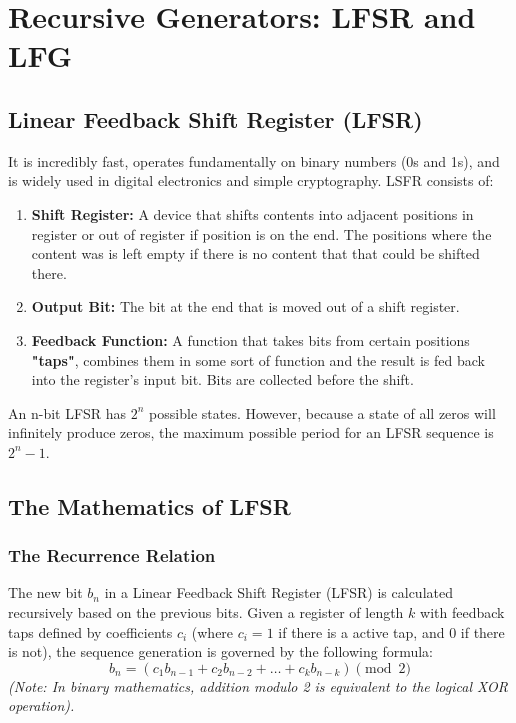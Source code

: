 \section{Recursive Generators: LFSR and LFG}

\subsection{Linear Feedback Shift Register (LFSR)} 

It is incredibly fast, operates fundamentally on binary numbers (0s and 1s), and is widely used in digital electronics and simple cryptography. LSFR consists of:

\begin{enumerate}
    \item \textbf{Shift Register:} A device that shifts contents into adjacent positions in register or out of register if position is on the end. The positions where the content was is left empty if there is no content that that could be shifted there. 
    
    \item \textbf{Output Bit:} The bit at the end that is moved out of a shift register.

    \item \textbf{Feedback Function:} A function that takes bits from certain positions \textbf{"taps"}, combines them in some sort of function and the result is fed back into the register's input bit. Bits are collected before the shift. 
    
\end{enumerate}

An n-bit LFSR has $2^n$ possible states. However, because a state of all zeros will infinitely produce zeros, the maximum possible period for an LFSR sequence is $2^n-1$.


\subsection{The Mathematics of LFSR}

\subsubsection{The Recurrence Relation}
The new bit $b_n$ in a Linear Feedback Shift Register (LFSR) is calculated recursively based on the previous bits. Given a register of length $k$ with feedback taps defined by coefficients $c_i$ (where $c_i = 1$ if there is a active tap, and $0$ if there is not), the sequence generation is governed by the following formula:
\[
b_{n} = (c_1 b_{n-1} + c_2 b_{n-2} + \dots + c_k b_{n-k}) \pmod 2
\]
\textit{(Note: In binary mathematics, addition modulo 2 is equivalent to the logical XOR operation).}

